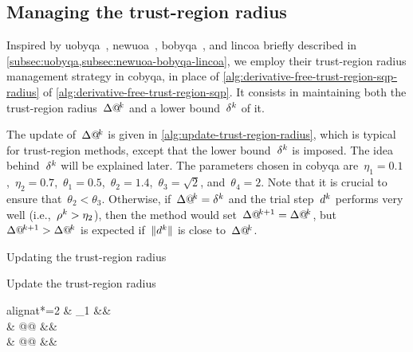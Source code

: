 \subsection{Managing the trust-region radius}
\label{subsec:managing-trust-region-radius}

Inspired by \gls{uobyqa}~\cite{Powell_2002}, \gls{newuoa}~\cite{Powell_2006}, \gls{bobyqa}~\cite{Powell_2009}, and \gls{lincoa} briefly described in \cref{subsec:uobyqa,subsec:newuoa-bobyqa-lincoa}, we employ their trust-region radius management strategy in \gls{cobyqa}, in place of \cref{alg:derivative-free-trust-region-sqp-radius} of \cref{alg:derivative-free-trust-region-sqp}.
It consists in maintaining both the trust-region radius~$\rad[k]$ and a lower bound~$\radlb[k]$ of it.

The update of~$\rad[k]$ is given in \cref{alg:update-trust-region-radius}, which is typical for trust-region methods, except that the lower bound~$\radlb[k]$ is imposed.
The idea behind~$\radlb[k]$ will be explained later.
The parameters chosen in \gls{cobyqa} are~$\eta_1 = 0.1$,~$\eta_2 = 0.7$,~$\theta_1 = 0.5$,~$\theta_2 = 1.4$,~$\theta_3 = \sqrt{2}$, and~$\theta_4 = 2$.
Note that it is crucial to ensure that~$\theta_2 < \theta_3$.
Otherwise, if~$\rad[k] = \radlb[k]$ and the trial step~$\step[k]$ performs very well (i.e.,~$\ratio[k] > \eta_2$), then the method would set~$\rad[k + 1] = \rad[k]$, but~$\rad[k + 1] > \rad[k]$ is expected if~$\norm{\step[k]}$ is close to~$\rad[k]$.

\begin{algorithm}
    \caption{Updating the trust-region radius}
    \label{alg:update-trust-region-radius}
    \DontPrintSemicolon
    \onehalfspacing
    Update the trust-region radius
    \begin{algoempheq}[left={\rad[k + 1] \gets \empheqlbrace}]{alignat*=2}
        & \theta_1 \rad[k]                                                                      && \quad {}\\
        & \max @@ \set{\theta_1 \rad[k], \norm{\step[k]}}                                          && \quad {}\\
        & \min @@     && \quad {}
    \end{algoempheq}
    \If{$\rad[k + 1] \le \theta_2 \radlb[k]$}{
        $\rad[k + 1] \gets \radlb[k]$\;
    }
\end{algorithm}

